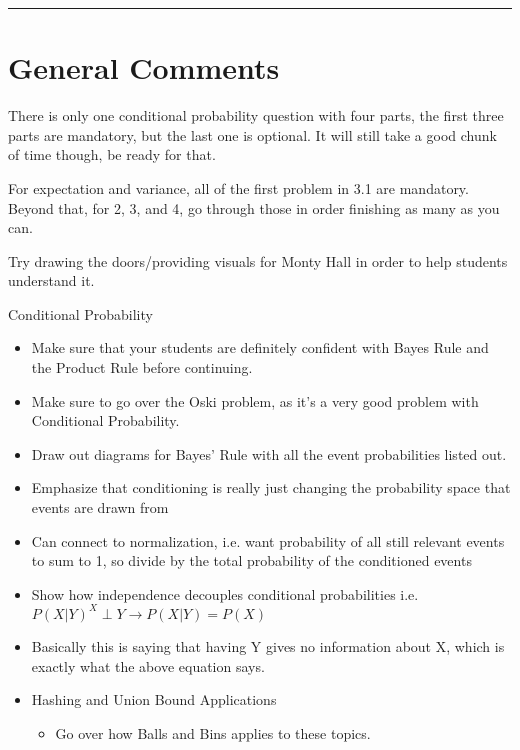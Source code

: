 \documentclass{exam}
\title{}
\date{Random Variables, Conditional Probability, Distributions}
\begin{document}
\maketitle
\rule{\textwidth}{0.15em}
\fontsize{12}{15}\selectfont
\thispagestyle{empty}


\section{General Comments}
\begin{questions}
\item There is only one conditional probability question with four parts, the first three parts are mandatory, but the last one is optional. It will still take a good chunk of time though, be ready for that.
\item For expectation and variance, all of the first problem in 3.1 are mandatory. Beyond that, for 2, 3, and 4, go through those in order finishing as many as you can.
\item Try drawing the doors/providing visuals for Monty Hall in order to help students understand it.
\item Conditional Probability
\begin{itemize}
\item Make sure that your students are definitely confident with Bayes Rule and the Product Rule before continuing. 
\item Make sure to go over the Oski problem, as it's a very good problem with Conditional Probability.
\item Draw out diagrams for Bayes' Rule with all the event probabilities listed out.
\item Emphasize that conditioning is really just changing the probability space that events are drawn from
\item Can connect to normalization, i.e. want probability of all still relevant events to sum to 1, so divide by the total probability of the conditioned events 
\item Show how independence decouples conditional probabilities 
i.e. $P(X|Y) ^ X \perp Y \rightarrow P(X|Y) = P(X)$
\item Basically this is saying that having Y gives no information about X, which is exactly what the above equation says.
\item Hashing and Union Bound Applications
\begin{itemize}
\item Go over how Balls and Bins applies to these topics.

\end{itemize}
\end{itemize}
\end{questions}
\end{document}
